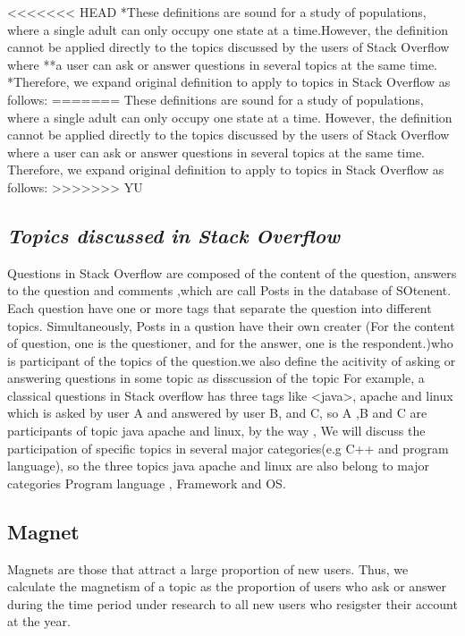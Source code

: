 \documentclass[conference]{IEEEtran}
\begin{document}
<<<<<<< HEAD
*These definitions are sound for a study of populations, where a single adult can only occupy one state at a time.However, the definition cannot be applied directly to the topics discussed by the users of Stack Overflow where **a user can ask or answer questions in several topics at the same time. *Therefore, we expand original definition to apply to topics in Stack Overflow as follows:
=======
These definitions are sound for a study of populations, where a single adult can only occupy one state at a time. However, the definition cannot be applied directly to the topics discussed by the users of Stack Overflow where a user can ask or answer questions in several topics at the same time. Therefore, we expand original definition to apply to topics in Stack Overflow as follows:
>>>>>>> YU

\medskip
\subsection*{\textit{\textbf{Topics discussed in Stack Overflow}}}

Questions in Stack Overflow are composed of the content of the question, answers to the question and comments ,which are call Posts in the database of SOtenent. Each question have one or more tags that separate the question into different topics. Simultaneously, Posts in a qustion have their own creater (For the content of question, one is the questioner, and for the answer, one is the respondent.)who is participant of the topics of the question.we also define the acitivity of asking or answering questions in some topic as disscussion of the topic For example, a classical questions in Stack overflow has three tags like <java>, apache and linux which is asked by user A and answered by user B, and C, so A ,B and C are participants of topic java apache and linux, by the way , We will discuss the participation of specific topics in several major categories(e.g C++ and program language), so the three topics java apache and linux are also belong to major categories Program language , Framework and OS.

\subsection*{Magnet}
Magnets are those that attract a large proportion of new users. Thus, we calculate the magnetism of a topic as the proportion of users who ask or answer during the time period under research to all new users who resigster their account at the year.
\end{document}
